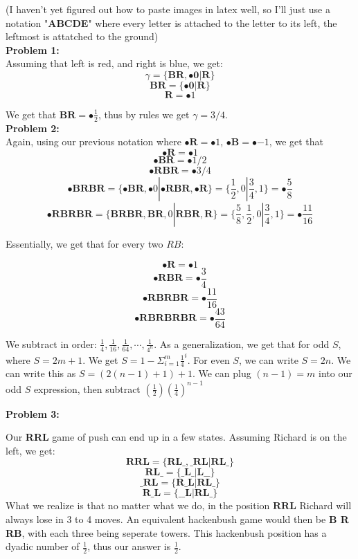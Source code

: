 \documentclass[12pt]{article}
\begin{document}
(I haven't yet figured out how to paste images in latex well, so I'll just use a notation
"\textbf{ABCDE}" where every letter is attached to the letter to its left, the leftmost is attatched to the ground)\\

\noindent
\textbf{Problem 1:}\\

Assuming that left is red, and right is blue, we get: 
$$\gamma = \{\textbf{BR}, \bullet \textbf{0} | \textbf{R}\}$$
$$\textbf{BR} = \{\bullet \textbf{0} | \textbf{R}\}$$
$$\textbf{R} = \bullet 1$$

We get that $\textbf{BR} = \bullet \frac{1}{2}$, thus by rules we get $\gamma = 3/4$. \\

\noindent 
\textbf{Problem 2: }\\

Again, using our previous notation where $\bullet \textbf{R} = \bullet 1$,
$\bullet \textbf{B} = \bullet{-1}$, we get that
$$\bullet \textbf{R} = \bullet 1$$
$$\bullet \textbf{BR} = \bullet 1/2$$
$$\bullet \textbf{RBR} = \bullet 3/4$$
$$\bullet \textbf{BRBR} = \{\bullet \textbf{BR}, \bullet 0 | \bullet \textbf{RBR}, 
\bullet \textbf{R}\} = \{\frac{1}{2}, 0 | \frac{3}{4} , 1\} = \bullet \frac{5}{8}$$
$$\bullet \textbf{RBRBR} = \{\textbf{BRBR}, \textbf{BR}, 0 | \textbf{RBR}, \textbf{R}\} 
= \{\frac{5}{8}, \frac{1}{2}, 0 | \frac{3}{4}, 1\} = \bullet \frac{11}{16}$$

Essentially, we get that for every two $RB$:

$$\bullet \textbf{R} = \bullet 1$$
$$\bullet \textbf{RBR} = \bullet \frac{3}{4}$$
$$\bullet \textbf{RBRBR} = \bullet \frac{11}{16}$$
$$\bullet \textbf{RBRBRBR} = \bullet \frac{43}{64}$$

We subtract in order: $\frac{1}{4}, \frac{1}{16}, \frac{1}{64}, \cdots, \frac{1}{4^n}$. 
As a generalization, we get that for odd $S$, where
$S = 2m + 1$. We get $S = 1 - \Sigma^{m}_{i = 1} \frac{1}{4}^{i}$. 
For even $S$, we can write $S = 2n$. We can write this as $S = (2(n-1) + 1) + 1$. 
We can plug $(n-1) = m$ into our odd $S$ expression, then subtract $(\frac{1}{2})(\frac{1}{4})^{n-1}$

\noindent
\textbf{Problem 3: }

Our \textbf{RRL} game of push can end up in a few states. Assuming Richard is on the left, we get: 
$$\textbf{RRL} = \{\textbf{RL\_}, \textbf{\_RL} | \textbf{RL\_} \}$$
$$\textbf{RL\_} = \{\textbf{\_L\_} | \textbf{L\_\_}\}$$
$$\textbf{\_RL} = \{\textbf{R\_L} | \textbf{RL\_}\}$$
$$\textbf{R\_L} = \{\textbf{\_\_L} | \textbf{RL\_}\}$$
What we realize is that no matter what we do, 
in the position $\textbf{RRL}$ Richard will always lose in 3 to 4 moves. 
An equivalent hackenbush game would then be \textbf{B R RB}, with each three being seperate towers. This hackenbush position has a dyadic number of 
$\frac{1}{2}$, thus our answer is $\frac{1}{2}$.
\end{document}
